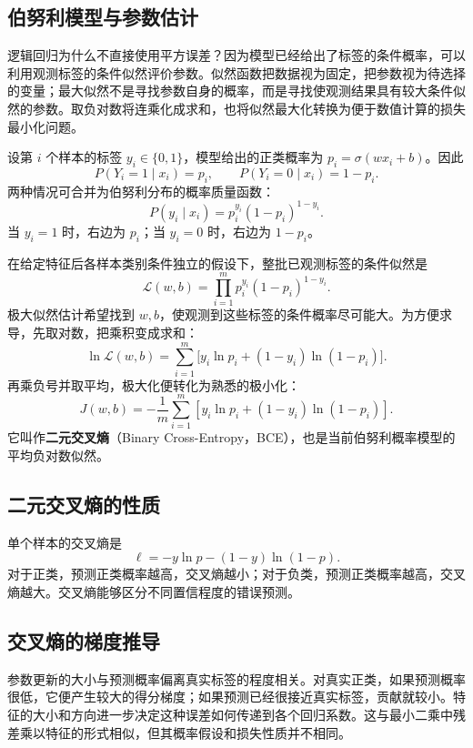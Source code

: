 \subsection{伯努利模型与参数估计}

逻辑回归为什么不直接使用平方误差？因为模型已经给出了标签的条件概率，可以利用观测标签的条件似然评价参数。似然函数把数据视为固定，把参数视为待选择的变量；最大似然不是寻找参数自身的概率，而是寻找使观测结果具有较大条件似然的参数。取负对数将连乘化成求和，也将似然最大化转换为便于数值计算的损失最小化问题。

设第 $i$ 个样本的标签 $y_i\in\{0,1\}$，模型给出的正类概率为 $p_i=\sigma(wx_i+b)$。因此
\[
P(Y_i=1\mid x_i)=p_i,\qquad P(Y_i=0\mid x_i)=1-p_i.
\]
两种情况可合并为伯努利分布的概率质量函数：
\begin{equation}\label{eq:bernoulli}
P(y_i\mid x_i)=p_i^{y_i}(1-p_i)^{1-y_i}.
\end{equation}
当 $y_i=1$ 时，右边为 $p_i$；当 $y_i=0$ 时，右边为 $1-p_i$。

在给定特征后各样本类别条件独立的假设下，整批已观测标签的条件似然是
\begin{equation}\label{eq:logit-likelihood}
\mathcal L(w,b)=\prod_{i=1}^{m}p_i^{y_i}(1-p_i)^{1-y_i}.
\end{equation}
极大似然估计希望找到 $w,b$，使观测到这些标签的条件概率尽可能大。为方便求导，先取对数，把乘积变成求和：
\[
\ln\mathcal L(w,b)=\sum_{i=1}^{m}\big[y_i\ln p_i+(1-y_i)\ln(1-p_i)\big].
\]
再乘负号并取平均，极大化便转化为熟悉的极小化：
\begin{equation}\label{eq:bce}
J(w,b)=-\frac1m\sum_{i=1}^{m}
\left[y_i\ln p_i+(1-y_i)\ln(1-p_i)\right].
\end{equation}
它叫作\textbf{二元交叉熵}（Binary Cross-Entropy，BCE），也是当前伯努利概率模型的平均负对数似然。

\subsection{二元交叉熵的性质}

单个样本的交叉熵是
\[
\ell=-y\ln p-(1-y)\ln(1-p).
\]
对于正类，预测正类概率越高，交叉熵越小；对于负类，预测正类概率越高，交叉熵越大。交叉熵能够区分不同置信程度的错误预测。

\subsection{交叉熵的梯度推导}

参数更新的大小与预测概率偏离真实标签的程度相关。对真实正类，如果预测概率很低，它便产生较大的得分梯度；如果预测已经很接近真实标签，贡献就较小。特征的大小和方向进一步决定这种误差如何传递到各个回归系数。这与最小二乘中残差乘以特征的形式相似，但其概率假设和损失性质并不相同。

